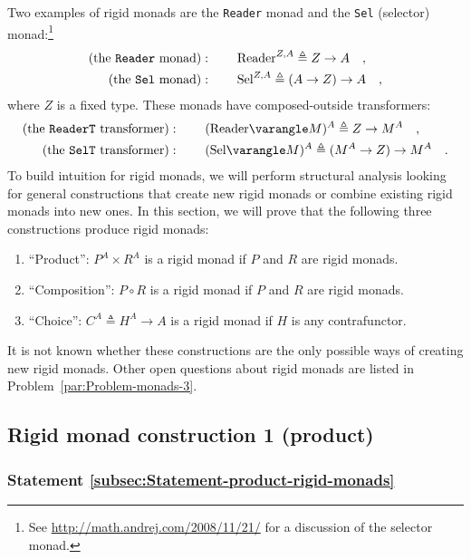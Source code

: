Two examples of rigid monads are the \lstinline!Reader! monad and
the \lstinline!Sel! (selector)
monad:\footnote{See \href{http://math.andrej.com/2008/11/21/}{http://math.andrej.com/2008/11/21/}
for a discussion of the selector monad.}
\begin{align*}
\text{(the \texttt{Reader} monad)} & :\quad\quad\text{Reader}^{Z,A}\triangleq Z\rightarrow A\quad,\\
\text{(the \texttt{Sel} monad)} & :\quad\quad\text{Sel}^{Z,A}\triangleq\left(A\rightarrow Z\right)\rightarrow A\quad,
\end{align*}
where $Z$ is a fixed type. These monads have composed-outside transformers:
\begin{align*}
\text{(the \texttt{ReaderT} transformer)} & :\quad\quad(\text{Reader}\varangle M)^{A}\triangleq Z\rightarrow M^{A}\quad,\\
\text{(the \texttt{SelT} transformer)} & :\quad\quad(\text{Sel}\varangle M)^{A}\triangleq(M^{A}\rightarrow Z)\rightarrow M^{A}\quad.
\end{align*}
To build intuition for rigid monads, we will perform structural analysis
looking for general constructions that create new rigid monads or
combine existing rigid monads into new ones. In this section, we will
prove that the following three constructions produce rigid monads:
\begin{enumerate}
\item \textsf{``}Product\textsf{''}: $P^{A}\times R^{A}$ is a rigid monad if $P$ and $R$
are rigid monads.
\item \textsf{``}Composition\textsf{''}: $P\circ R$ is a rigid monad if $P$ and $R$ are
rigid monads.
\item \textsf{``}Choice\textsf{''}: $C^{A}\triangleq H^{A}\rightarrow A$ is a rigid monad
if $H$ is any contrafunctor.
\end{enumerate}
It is not known whether these constructions are the only possible
ways of creating new rigid monads. Other open questions about rigid
monads are listed in Problem~\ref{par:Problem-monads-3}.

\subsection{Rigid monad construction 1 (product)}

\subsubsection{Statement \label{subsec:Statement-product-rigid-monads}\ref{subsec:Statement-product-rigid-monads}}

